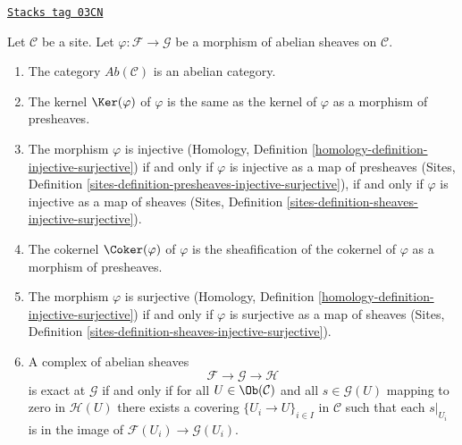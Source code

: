 \begin{lemma}
\label{sites-modules-lemma-abelian-abelian}
\href{https://stacks.math.columbia.edu/tag/03CN}{\texttt{Stacks tag 03CN}}

Let $\mathcal{C}$ be a site. Let $\varphi : \mathcal{F} \to \mathcal{G}$
be a morphism of abelian sheaves on $\mathcal{C}$.
\begin{enumerate}
\item The category $\textit{Ab}(\mathcal{C})$ is an abelian category.
\item The kernel $\Ker(\varphi)$ of $\varphi$ is the same as the
kernel of $\varphi$ as a morphism of presheaves.
\item The morphism $\varphi$ is injective
(Homology, Definition \ref{homology-definition-injective-surjective})
if and only if $\varphi$ is injective as a map of presheaves
(Sites, Definition \ref{sites-definition-presheaves-injective-surjective}),
if and only if $\varphi$ is injective as a map of sheaves
(Sites, Definition \ref{sites-definition-sheaves-injective-surjective}).
\item The cokernel $\Coker(\varphi)$ of $\varphi$ is the sheafification
of the cokernel of $\varphi$ as a morphism of presheaves.
\item The morphism $\varphi$ is surjective
(Homology, Definition \ref{homology-definition-injective-surjective})
if and only if $\varphi$ is surjective as a map of sheaves
(Sites, Definition \ref{sites-definition-sheaves-injective-surjective}).
\item A complex of abelian sheaves
$$
\mathcal{F} \to \mathcal{G} \to \mathcal{H}
$$
is exact at $\mathcal{G}$ if and only if for all
$U \in \Ob(\mathcal{C})$ and all $s \in \mathcal{G}(U)$
mapping to zero in $\mathcal{H}(U)$ there exists a covering
$\{U_i \to U\}_{i \in I}$ in $\mathcal{C}$ such that each
$s|_{U_i}$ is in the image of $\mathcal{F}(U_i) \to \mathcal{G}(U_i)$.
\end{enumerate}
\end{lemma}

